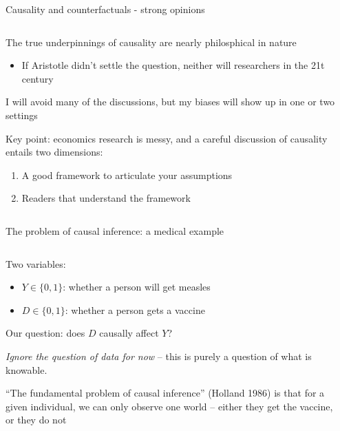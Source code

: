 \documentclass[notes,11pt, aspectratio=169]{beamer}
\newenvironment{wideitemize}{\itemize\addtolength{\itemsep}{10pt}}{\enditemize}
\begin{document}
\begin{frame}{Causality and counterfactuals - strong opinions}
\begin{columns}[T] %
\begin{column}{.65\textwidth}
  \begin{wideitemize}
  \item The true underpinnings of causality are nearly philosphical in nature
    \begin{itemize}
    \item If Aristotle didn't settle the question, neither will
      researchers in the 21t century
    \end{itemize}
  \item I will avoid many of the discussions, but my biases will show up in one or two settings
  \item Key point: economics research is messy, and a careful
    discussion of causality entails two dimensions:
    \begin{enumerate}
    \item A good framework to articulate your assumptions
    \item Readers that understand the framework
    \end{enumerate}
  \end{wideitemize}
\end{column}%
\hfill%
\begin{column}{.38\textwidth}

\end{column}%
\end{columns}
\end{frame}

\begin{frame}{The problem of causal inference: a medical example}
\begin{columns}[T] %
\begin{column}{.8\textwidth}
  \begin{wideitemize}
    \item  Two variables:
    \begin{itemize}
    \item $Y \in \{0, 1\}$: whether a person will get measles
    \item $D \in \{0, 1\}$: whether a person gets a vaccine
    \end{itemize}
  \item Our question: does $D$ causally affect $Y$?
  \item \emph{Ignore the question of data for now} -- this is purely a
    question of what is knowable.
  \item ``The fundamental problem of causal inference'' (Holland 1986)
    is that for a given individual, we can only observe one world --
    either they get the vaccine, or they do not
  \end{wideitemize}
\end{column}%
\hfill%
\begin{column}{.38\textwidth}
\end{column}%
\end{columns}
\end{frame}
\end{document}
